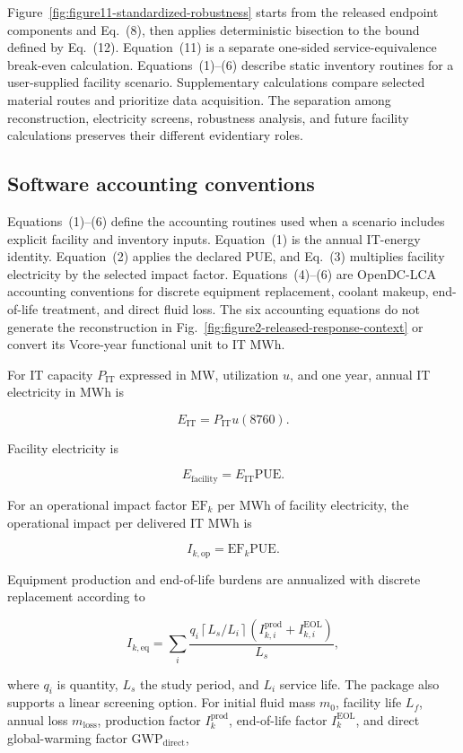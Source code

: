 \documentclass[review,a4paper,fleqn]{cas-sc}
\begin{document}
Figure~\ref{fig:figure11-standardized-robustness} starts from the released endpoint components and Eq.~(8), then applies deterministic bisection to the bound defined by Eq.~(12). Equation~(11) is a separate one-sided service-equivalence break-even calculation. Equations~(1)--(6) describe static inventory routines for a user-supplied facility scenario. Supplementary calculations compare selected material routes and prioritize data acquisition. The separation among reconstruction, electricity screens, robustness analysis, and future facility calculations preserves their different evidentiary roles.

\subsection{Software accounting conventions}
Equations~(1)--(6) define the accounting routines used when a scenario includes explicit facility and inventory inputs. Equation~(1) is the annual IT-energy identity. Equation~(2) applies the declared PUE, and Eq.~(3) multiplies facility electricity by the selected impact factor. Equations~(4)--(6) are OpenDC-LCA accounting conventions for discrete equipment replacement, coolant makeup, end-of-life treatment, and direct fluid loss. The six accounting equations do not generate the reconstruction in Fig.~\ref{fig:figure2-released-response-context} or convert its Vcore-year functional unit to IT MWh.

For IT capacity $P_\mathrm{IT}$ expressed in MW, utilization $u$, and one year, annual IT electricity in MWh is

\[
E_\mathrm{IT}=P_\mathrm{IT}u(8760).
\tag{1}
\]

Facility electricity is

\[
E_\mathrm{facility}=E_\mathrm{IT}\mathrm{PUE}.
\tag{2}
\]

For an operational impact factor $\mathrm{EF}_k$ per MWh of facility electricity, the operational impact per delivered IT MWh is

\[
I_{k,\mathrm{op}}=\mathrm{EF}_k\mathrm{PUE}.
\tag{3}
\]

Equipment production and end-of-life burdens are annualized with discrete replacement according to

\[
I_{k,\mathrm{eq}} =
\sum_i
\frac{q_i\left\lceil L_s/L_i\right\rceil
\left(I_{k,i}^{\mathrm{prod}}+I_{k,i}^{\mathrm{EOL}}\right)}
{L_s},
\tag{4}
\]

where $q_i$ is quantity, $L_s$ the study period, and $L_i$ service life. The package also supports a linear screening option. For initial fluid mass $m_0$, facility life $L_f$, annual loss $m_\mathrm{loss}$, production factor $I_k^\mathrm{prod}$, end-of-life factor $I_k^\mathrm{EOL}$, and direct global-warming factor $\mathrm{GWP}_\mathrm{direct}$,
\end{document}
